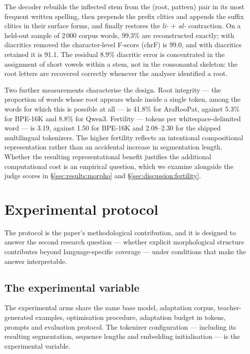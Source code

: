 \documentclass[a4paper,fleqn]{cas-sc}
\begin{document}
The decoder rebuilds the inflected stem from the (root, pattern) pair in its most frequent written spelling, then prepends the prefix clitics and appends the suffix clitics in their surface forms, and finally restores the \emph{li-} + \emph{al-} contraction. On a held-out sample of 2\,000 corpus words, 99.3\% are reconstructed exactly; with diacritics removed the character-level F-score (chrF) is 99.0, and with diacritics retained it is 91.1. The residual 8.9\% diacritic error is concentrated in the assignment of short vowels within a stem, not in the consonantal skeleton: the root letters are recovered correctly whenever the analyser identified a root.

Two further measurements characterise the design. Root integrity --- the proportion of words whose root appears whole inside a single token, among the words for which this is possible at all --- is 41.8\% for AraRooPat, against 5.3\% for BPE-16K and 8.8\% for Qwen3. Fertility --- tokens per whitespace-delimited word --- is 3.19, against 1.50 for BPE-16K and 2.08--2.30 for the shipped multilingual tokenizers. The higher fertility reflects an intentional compositional representation rather than an accidental increase in segmentation length. Whether the resulting representational benefit justifies the additional computational cost is an empirical question, which we examine alongside the judge scores in \S\ref{sec:results:morpho} and \S\ref{sec:discussion:fertility}.

\section{Experimental protocol}
\label{sec:protocol}

The protocol is the paper's methodological contribution, and it is designed to answer the second research question --- whether explicit morphological structure contributes beyond language-specific coverage --- under conditions that make the answer interpretable.

\subsection{The experimental variable}
\label{sec:protocol:design}

The experimental arms share the same base model, adaptation corpus, teacher-generated examples, optimisation procedure, adaptation budget in tokens, prompts and evaluation protocol. The tokenizer configuration --- including its resulting segmentation, sequence lengths and embedding initialisation --- is the experimental variable.
\end{document}
